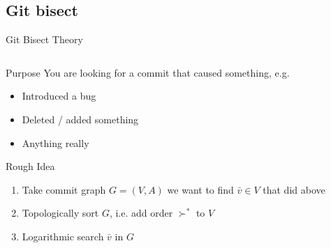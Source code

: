 \documentclass[xetex, handout]{beamer}
\begin{document}
\subsection{Git bisect}

\begin{frame}[fragile]{Git Bisect Theory}
  \begin{columns}
    \begin{column}{.5\linewidth}
      \begin{block}{Purpose}
        You are looking for a commit that caused something, e.g.
        \begin{itemize}
          \item Introduced a bug
          \item Deleted / added something
          \item Anything really
        \end{itemize}
      \end{block}
      \begin{alertblock}{Rough Idea}
        \begin{enumerate}
          \item Take commit graph $G = (V,A)$ we want to find $\bar{v} \in V$
            that did above
          \item Topologically sort $G$, i.e. add order $\succ^*$ to $V$
          \item Logarithmic search $\bar{v}$ in $G$
        \end{enumerate}
      \end{alertblock}
    \end{column}
    \begin{column}{.5\linewidth}
\end{column}
\end{columns}
\end{frame}
\end{document}
